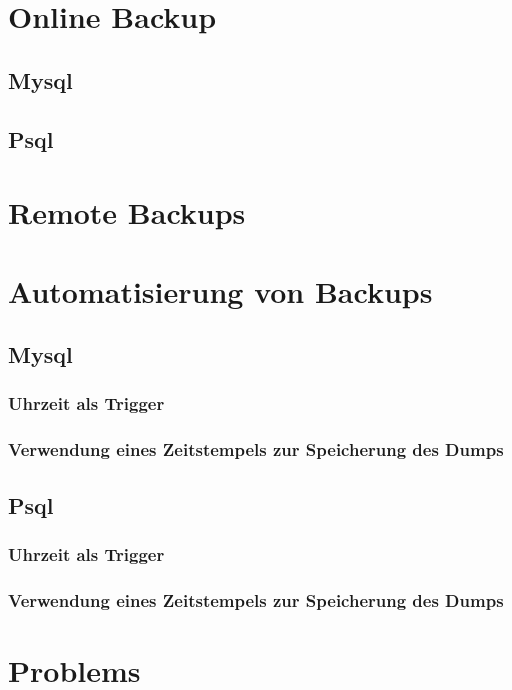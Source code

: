 \documentclass[10pt]{article}
\begin{document}
\section{Online Backup}
\subsection{Mysql}
\subsection{Psql}

\section{Remote Backups}

\section{Automatisierung von Backups}
\subsection{Mysql}
\subsubsection{Uhrzeit als Trigger}
\subsubsection{Verwendung eines Zeitstempels zur Speicherung des Dumps}
\subsection{Psql}
\subsubsection{Uhrzeit als Trigger}
\subsubsection{Verwendung eines Zeitstempels zur Speicherung des Dumps}


\section{Problems}
\end{document}

